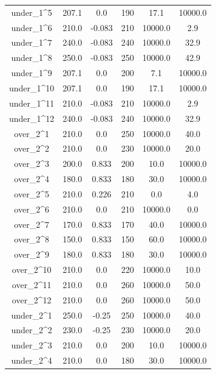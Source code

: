 \documentclass[a4paper,11pt]{article}
\begin{document}
\begin{longtable}{cccccc}
under\_1\textasciicircum{}5 & 207.1 & 0.0 & 190 & 17.1 & 10000.0\\
\addlinespace
under\_1\textasciicircum{}6 & 210.0 & -0.083 & 210 & 10000.0 & 2.9\\
under\_1\textasciicircum{}7 & 240.0 & -0.083 & 240 & 10000.0 & 32.9\\
under\_1\textasciicircum{}8 & 250.0 & -0.083 & 250 & 10000.0 & 42.9\\
under\_1\textasciicircum{}9 & 207.1 & 0.0 & 200 & 7.1 & 10000.0\\
under\_1\textasciicircum{}10 & 207.1 & 0.0 & 190 & 17.1 & 10000.0\\
\addlinespace
under\_1\textasciicircum{}11 & 210.0 & -0.083 & 210 & 10000.0 & 2.9\\
under\_1\textasciicircum{}12 & 240.0 & -0.083 & 240 & 10000.0 & 32.9\\
over\_2\textasciicircum{}1 & 210.0 & 0.0 & 250 & 10000.0 & 40.0\\
over\_2\textasciicircum{}2 & 210.0 & 0.0 & 230 & 10000.0 & 20.0\\
over\_2\textasciicircum{}3 & 200.0 & 0.833 & 200 & 10.0 & 10000.0\\
\addlinespace
over\_2\textasciicircum{}4 & 180.0 & 0.833 & 180 & 30.0 & 10000.0\\
over\_2\textasciicircum{}5 & 210.0 & 0.226 & 210 & 0.0 & 4.0\\
over\_2\textasciicircum{}6 & 210.0 & 0.0 & 210 & 10000.0 & 0.0\\
over\_2\textasciicircum{}7 & 170.0 & 0.833 & 170 & 40.0 & 10000.0\\
over\_2\textasciicircum{}8 & 150.0 & 0.833 & 150 & 60.0 & 10000.0\\
\addlinespace
over\_2\textasciicircum{}9 & 180.0 & 0.833 & 180 & 30.0 & 10000.0\\
over\_2\textasciicircum{}10 & 210.0 & 0.0 & 220 & 10000.0 & 10.0\\
over\_2\textasciicircum{}11 & 210.0 & 0.0 & 260 & 10000.0 & 50.0\\
over\_2\textasciicircum{}12 & 210.0 & 0.0 & 260 & 10000.0 & 50.0\\
under\_2\textasciicircum{}1 & 250.0 & -0.25 & 250 & 10000.0 & 40.0\\
\addlinespace
under\_2\textasciicircum{}2 & 230.0 & -0.25 & 230 & 10000.0 & 20.0\\
under\_2\textasciicircum{}3 & 210.0 & 0.0 & 200 & 10.0 & 10000.0\\
under\_2\textasciicircum{}4 & 210.0 & 0.0 & 180 & 30.0 & 10000.0\\

\end{longtable}
\end{document}
